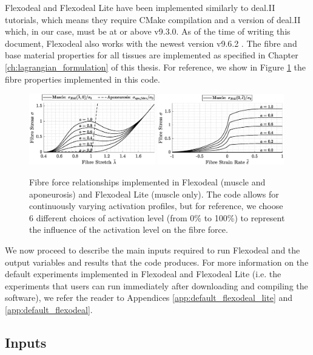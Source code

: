 \documentclass{sfuthesis}
\numberwithin{equation}{section}
\numberwithin{figure}{chapter}
\numberwithin{table}{chapter}
\theoremstyle{definition}
\begin{document}
Flexodeal and Flexodeal Lite have been implemented similarly to deal.II tutorials, which means they require CMake compilation and a version of deal.II which, in our case, must be at or above v9.3.0. As of the time of writing this document, Flexodeal also works with the newest version v9.6.2 \cite{dealii962}. The fibre and base material properties for all tissues are implemented as specified in Chapter \ref{ch:lagrangian_formulation} of this thesis. For reference, we show in Figure \ref{fig:FL_curves_diff_act} the fibre properties implemented in this code.

\begin{figure}
    \centering
    \includegraphics[width=0.49\textwidth]{fibre-FL-diff-a.eps}
    \includegraphics[width=0.49\textwidth]{fibre-FV-diff-a.eps}
    \caption{Fibre force relationships implemented in Flexodeal (muscle and aponeurosis) and Flexodeal Lite (muscle only). The code allows for continuously varying activation profiles, but for reference, we choose 6 different choices of activation level (from 0\% to 100\%) to represent the influence of the activation level on the fibre force. 
    \label{fig:FL_curves_diff_act}}
\end{figure}

We now proceed to describe the main inputs required to run Flexodeal and the output variables and results that the code produces. For more information on the default experiments implemented in Flexodeal and Flexodeal Lite (i.e. the experiments that users can run immediately after downloading and compiling the software), we refer the reader to Appendices \ref{app:default_flexodeal_lite} and  \ref{app:default_flexodeal}.

\subsection{Inputs}
\end{document}
